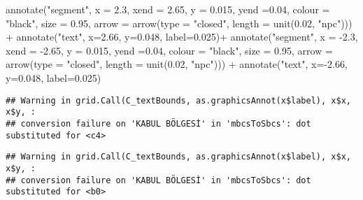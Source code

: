 \documentclass[
  12pt,
]{book}
\newenvironment{Shaded}{\begin{snugshade}}{\end{snugshade}}
\newcommand{\AttributeTok}[1]{\textcolor[rgb]{0.77,0.63,0.00}{#1}}
\newcommand{\FloatTok}[1]{\textcolor[rgb]{0.00,0.00,0.81}{#1}}
\newcommand{\FunctionTok}[1]{\textcolor[rgb]{0.00,0.00,0.00}{#1}}
\newcommand{\NormalTok}[1]{#1}
\newcommand{\SpecialCharTok}[1]{\textcolor[rgb]{0.00,0.00,0.00}{#1}}
\newcommand{\StringTok}[1]{\textcolor[rgb]{0.31,0.60,0.02}{#1}}
\begin{document}
\begin{Shaded}
\begin{Highlighting}[]
  \FunctionTok{annotate}\NormalTok{(}\StringTok{"segment"}\NormalTok{, }\AttributeTok{x =} \FloatTok{2.3}\NormalTok{, }\AttributeTok{xend =} \FloatTok{2.65}\NormalTok{, }\AttributeTok{y =} \FloatTok{0.015}\NormalTok{, }\AttributeTok{yend =}\FloatTok{0.04}\NormalTok{,}
           \AttributeTok{colour =} \StringTok{"black"}\NormalTok{, }\AttributeTok{size =} \FloatTok{0.95}\NormalTok{, }\AttributeTok{arrow =} \FunctionTok{arrow}\NormalTok{(}\AttributeTok{type =} \StringTok{"closed"}\NormalTok{, }\AttributeTok{length =} \FunctionTok{unit}\NormalTok{(}\FloatTok{0.02}\NormalTok{, }\StringTok{"npc"}\NormalTok{))) }\SpecialCharTok{+}
  \FunctionTok{annotate}\NormalTok{(}\StringTok{"text"}\NormalTok{, }\AttributeTok{x=}\FloatTok{2.66}\NormalTok{, }\AttributeTok{y=}\FloatTok{0.048}\NormalTok{, }\AttributeTok{label=}\StringTok{\textquotesingle{}0.025\textquotesingle{}}\NormalTok{)}\SpecialCharTok{+}
  \FunctionTok{annotate}\NormalTok{(}\StringTok{"segment"}\NormalTok{, }\AttributeTok{x =} \SpecialCharTok{{-}}\FloatTok{2.3}\NormalTok{, }\AttributeTok{xend =} \SpecialCharTok{{-}}\FloatTok{2.65}\NormalTok{, }\AttributeTok{y =} \FloatTok{0.015}\NormalTok{, }\AttributeTok{yend =}\FloatTok{0.04}\NormalTok{,}
           \AttributeTok{colour =} \StringTok{"black"}\NormalTok{, }\AttributeTok{size =} \FloatTok{0.95}\NormalTok{, }\AttributeTok{arrow =} \FunctionTok{arrow}\NormalTok{(}\AttributeTok{type =} \StringTok{"closed"}\NormalTok{, }\AttributeTok{length =} \FunctionTok{unit}\NormalTok{(}\FloatTok{0.02}\NormalTok{, }\StringTok{"npc"}\NormalTok{))) }\SpecialCharTok{+}
  \FunctionTok{annotate}\NormalTok{(}\StringTok{"text"}\NormalTok{, }\AttributeTok{x=}\SpecialCharTok{{-}}\FloatTok{2.66}\NormalTok{, }\AttributeTok{y=}\FloatTok{0.048}\NormalTok{, }\AttributeTok{label=}\StringTok{\textquotesingle{}0.025\textquotesingle{}}\NormalTok{)}
\end{Highlighting}
\end{Shaded}

\begin{verbatim}
## Warning in grid.Call(C_textBounds, as.graphicsAnnot(x$label), x$x, x$y, :
## conversion failure on 'KABUL BÖLGESİ' in 'mbcsToSbcs': dot substituted for <c4>
\end{verbatim}

\begin{verbatim}
## Warning in grid.Call(C_textBounds, as.graphicsAnnot(x$label), x$x, x$y, :
## conversion failure on 'KABUL BÖLGESİ' in 'mbcsToSbcs': dot substituted for <b0>
\end{verbatim}
\end{document}
